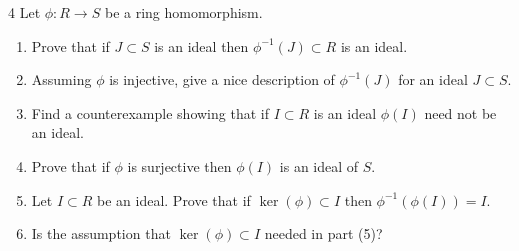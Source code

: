 \documentclass[Notebook.tex]{subfiles}
\begin{document}
\newpage

\begin{problem}{4}
    Let $\phi:R \to S$ be a ring homomorphism.
    \begin{enumerate}[label=(\alph*),ref=\theenumi\alph*]
		\item Prove that if $J \subset S$ is an ideal then $\phi^{-1}(J) \subset R$ is an ideal.
		\item Assuming $\phi$ is injective, give a nice description of $\phi^{-1}(J)$ for an ideal $J \subset S$. 
		\item Find a counterexample showing that if $I \subset R$ is an ideal $\phi(I)$ need not be an ideal.
		\item Prove that if $\phi$ is surjective then $\phi(I)$ is an ideal of $S$. 
		\item Let $I \subset R$ be an ideal. Prove that if $\ker(\phi) \subset I$ then $\phi^{-1}(\phi(I))=I$.
		\item Is the assumption that $\ker(\phi) \subset I$ needed in part (5)?
	\end{enumerate}
\end{problem}
\end{document}

